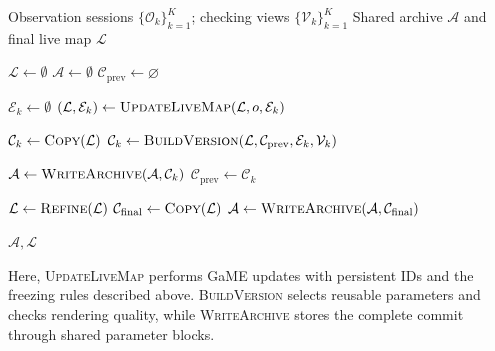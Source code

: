 \begin{algorithm}[h]
\caption{VersionGS Mapping and Commit Procedure}
\label{alg:versiongs}
\begin{algorithmic}[1]
\Require Observation sessions $\{\mathcal{O}_k\}_{k=1}^{K}$;
         checking views $\{\mathcal{V}_k\}_{k=1}^{K}$
\Ensure Shared archive $\mathcal{A}$ and final live map $\mathcal{L}$

\State $\mathcal{L} \gets \emptyset$
\State $\mathcal{A} \gets \emptyset$
\State $\mathcal{C}_{\mathrm{prev}} \gets \varnothing$

    \State $\mathcal{E}_k \gets \emptyset$
            \State $(\mathcal{L},\mathcal{E}_k)
                \gets \Call{UpdateLiveMap}
                {\mathcal{L},o,\mathcal{E}_k}$
        \EndIf
    \EndFor

        \State $\mathcal{C}_k \gets \Call{Copy}{\mathcal{L}}$
    \Else
        \State $\mathcal{C}_k \gets \Call{BuildVersion}
            {\mathcal{L},\mathcal{C}_{\mathrm{prev}},
             \mathcal{E}_k,\mathcal{V}_k}$
    \EndIf

    \State $\mathcal{A} \gets
        \Call{WriteArchive}{\mathcal{A},\mathcal{C}_k}$
    \State $\mathcal{C}_{\mathrm{prev}} \gets \mathcal{C}_k$
    \State {}
\EndFor

\State {}
\State $\mathcal{L} \gets \Call{Refine}{\mathcal{L}}$
\State $\mathcal{C}_{\mathrm{final}}
    \gets \Call{Copy}{\mathcal{L}}$
\State $\mathcal{A} \gets
    \Call{WriteArchive}{\mathcal{A},\mathcal{C}_{\mathrm{final}}}$

\State \Return $\mathcal{A},\mathcal{L}$
\end{algorithmic}
\end{algorithm}

Here, \textsc{UpdateLiveMap} performs GaME updates with persistent
IDs and the freezing rules described above.
\textsc{BuildVersion} selects reusable parameters and checks
rendering quality, while \textsc{WriteArchive} stores the complete
commit through shared parameter blocks.
